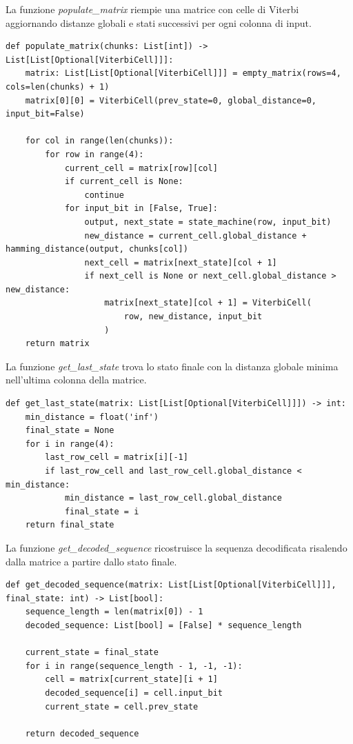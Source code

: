 La funzione \textit{populate\_matrix} riempie una matrice con celle di Viterbi aggiornando distanze globali e stati successivi per ogni colonna di input.

\begin{verbatim}
def populate_matrix(chunks: List[int]) -> List[List[Optional[ViterbiCell]]]:
    matrix: List[List[Optional[ViterbiCell]]] = empty_matrix(rows=4, cols=len(chunks) + 1)
    matrix[0][0] = ViterbiCell(prev_state=0, global_distance=0, input_bit=False)

    for col in range(len(chunks)):
        for row in range(4):
            current_cell = matrix[row][col]
            if current_cell is None:
                continue
            for input_bit in [False, True]:
                output, next_state = state_machine(row, input_bit)
                new_distance = current_cell.global_distance + hamming_distance(output, chunks[col])
                next_cell = matrix[next_state][col + 1]
                if next_cell is None or next_cell.global_distance > new_distance:
                    matrix[next_state][col + 1] = ViterbiCell(
                        row, new_distance, input_bit
                    )
    return matrix
\end{verbatim}
La funzione \textit{get\_last\_state} trova lo stato finale con la distanza globale minima nell'ultima colonna della matrice.
\begin{verbatim}
def get_last_state(matrix: List[List[Optional[ViterbiCell]]]) -> int:
    min_distance = float('inf')
    final_state = None
    for i in range(4):
        last_row_cell = matrix[i][-1]
        if last_row_cell and last_row_cell.global_distance < min_distance:
            min_distance = last_row_cell.global_distance
            final_state = i
    return final_state
\end{verbatim}
La funzione \textit{get\_decoded\_sequence} ricostruisce la sequenza decodificata risalendo dalla matrice a partire dallo stato finale.
\begin{verbatim}
def get_decoded_sequence(matrix: List[List[Optional[ViterbiCell]]], final_state: int) -> List[bool]:
    sequence_length = len(matrix[0]) - 1
    decoded_sequence: List[bool] = [False] * sequence_length
    
    current_state = final_state
    for i in range(sequence_length - 1, -1, -1):
        cell = matrix[current_state][i + 1]
        decoded_sequence[i] = cell.input_bit
        current_state = cell.prev_state

    return decoded_sequence
\end{verbatim}


